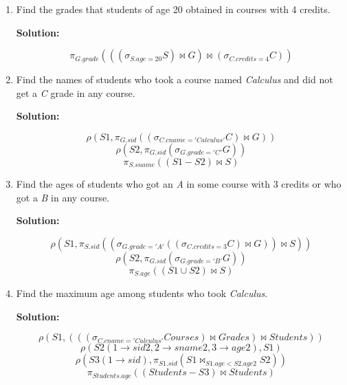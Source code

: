 \begin{enumerate}[label=(\alph*)]

\item Find the grades that students of age 20 obtained in courses with 4 credits.

\textbf{Solution:}

$$ \pi_{G.grade}(((\sigma_{S.age=20}S)\Join G)\Join (\sigma_{C.credits=4}C)) $$

\item Find the names of students who took a course named \textit{Calculus} and did not get a \textit{C} grade in any course.

\textbf{Solution:}

$$ \rho(S1,\pi_{G.sid}((\sigma_{C.cname='Calculus'}C)\Join G)) $$
$$ \rho(S2,\pi_{G.sid}(\sigma_{G.grade='C'}G)) $$
$$ \pi_{S.sname}((S1-S2)\Join S) $$

\item Find the ages of students who got an \textit{A} in some course with 3 credits or who got a \textit{B} in any course.

\textbf{Solution:}

$$\rho(S1,\pi_{S.sid}((\sigma_{G.grade='A'}((\sigma_{C.credits=3}C)\Join G))\Join S)) $$
$$\rho(S2,\pi_{G.sid}(\sigma_{G.grade='B'}G)) $$
$$ \pi_{S.age} ((S1\cup S2)\Join S) $$

\item Find the maximum age among students who took \textit{Calculus}.

\textbf{Solution:}

$$ \rho(S1,(((\sigma_{C.cname='Calculus'}Courses)\Join Grades)\Join Students) ) $$
$$ \rho(S2(1\rightarrow sid2,2\rightarrow sname2, 3\rightarrow age2),S1) $$
$$ \rho(S3(1\rightarrow sid), \pi_{S1.sid}(S1\Join_{S1.age<S2.age2} S2)) $$
$$ \pi_{Students.age}((Students - S3)\Join Students ) $$

\end{enumerate}
